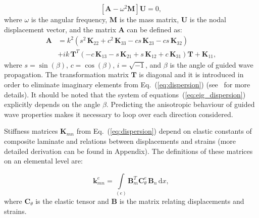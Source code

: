 \documentclass[preprint,12pt]{elsarticle}
\newcommand{\matr}[1]{\mathbf{#1}} %
\newcommand{\vect}[1]{\mathbf{#1}} %
\newcommand{\ud}{\mathrm{d}}
\begin{document}
	\begin{equation}
	\left[\matr{A} - \omega^2\matr{M} \right] \vect{U} =0,
	\label{eq:eig_dispersion}
	\end{equation}
	where \(\omega\) is the angular frequency, \(\matr{M}\) is the mass matrix, 
	\(\matr{U}\) is the nodal displacement vector, and the matrix \(\matr{A}\) can be 
	defined as:
	\begin{equation}
	\begin{aligned}
	\matr{A} & =  k^2\left(s^2 \,\matr{K}_{22} + c^2\, \matr{K}_{33} - c s\, \matr{K}_{23} - c s\, \matr{K}_{32}\right) \\
	& + i k\, \matr{T}^T\left(-c\, \matr{K}_{13} - s\, \matr{K}_{21} + s\, \matr{K}_{12} + c\, \matr{K}_{31}\right) \matr{T} +\matr{K}_{11},
	\end{aligned}
	\label{eq:dispersion}
	\end{equation}
	where  \(s = \sin(\beta)\), \(c = \cos(\beta)\), \(i = \sqrt{-1}\), and \(\beta\) is the angle 
	of guided wave propagation. The transformation matrix \(\matr{T}\) is diagonal and it 
	is introduced in order to eliminate imaginary elements from Eq.~(\ref{eq:dispersion}) 
	(see~\cite{Bartoli2006} for more details). It should be noted that the system of 
	equations~(\ref{eq:eig_dispersion}) explicitly depends on the angle \(\beta\). 
	Predicting the anisotropic behaviour of guided wave properties makes it necessary to 
	loop over each direction considered.
	
	Stiffness matrices \(\matr{K}_{mn}\) from Eq.~(\ref{eq:dispersion}) depend on elastic 
	constants of composite laminate and relations between displacements and strains 
	(more detailed derivation can be found in Appendix). The definitions of these matrices 
	on an elemental level are:
	
	\begin{equation}
	\matr{k}_{mn}^e= \int \limits_{(e)} \matr{B}_m^{T} \matr{C}_{\theta}^e \, \matr{B}_n\, \ud x, 
	\label{eq:stiffness_matrix_e}
	\end{equation}
	where \(\matr{C}_{\theta}\) is the elastic tensor and \(\matr{B}\) is the matrix relating 
	displacements and strains.
	
\end{document}
